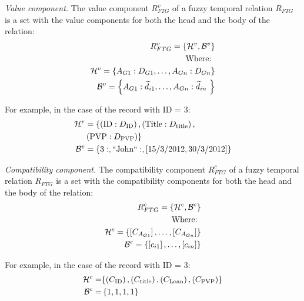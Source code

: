 \begin{definition}
\label{def:value-component}
\emph{Value component.}
The value component $R^{v}_{FTG}$ of a fuzzy temporal relation $R_{FTG}$ is a set with the value components for both the head and the body of the relation:
\begin{align}
\label{eq:value-component}
R^{v}_{FTG} = \left \lbrace \mathcal{H}^{v},\mathcal{B}^{v} \right \rbrace \\
\nonumber
\text{Where: } \\
\nonumber
\mathcal{H}^{v} = \left \lbrace A_{G1}:D_{G1}, \ldots,  A_{Gn}:D_{Gn} \right \rbrace \\
\nonumber
\mathcal{B}^ {v} = \left \lbrace A_{G1}:\widetilde{d}_{i1}, \ldots,  A_{Gn}:\widetilde{d}_{in}\ \right \rbrace 
\end{align}
\end{definition}

For example, in the case of the record with ID = 3:
\begin{align}
\nonumber
\mathcal{H}^{v} &=  \lbrace \left(\text{ID}:D_{\text{ID}}\right), \left(\text{Title}:D_{\text{title}}\right),\\
\nonumber
& \left(\text{PVP}:D_{\text{PVP}}\right) \rbrace \\
\nonumber
\mathcal{B}^ {v} &= \left \lbrace 3:, \text{``John``}: ,  \left[15/3/2012, 30/3/2012\right] \right \rbrace 
\end{align}


\begin{definition}
\label{def:compatibility-component}
\emph{Compatibility component.}
The compatibility component $R^{c}_{FTG}$ of a fuzzy temporal relation $R_{FTG}$ is a set with the compatibility components for both the head and the body of the relation:
\begin{align}
\label{eq:compatibility-component}
R^{c}_{FTG} = \left \lbrace \mathcal{H}^{c},\mathcal{B}^{c} \right \rbrace \\
\nonumber
\text{Where: } \\
\nonumber
\mathcal{H}^{c} = \left \lbrace \left[C_{A_{G1}} \right], \ldots,  \left[C_{A_{Gn}} \right] \right \rbrace \\
\nonumber
\mathcal{B}^ {c} = \left \lbrace \left[ c_{i1} \right], \ldots, \left[ c_{in} \right] \right \rbrace 
\end{align}
\end{definition}

For example, in the case of the record with ID = 3:
\begin{align}
\nonumber
\mathcal{H}^{c} = & \lbrace \left(C_\text{ID}\right), \left(C_{\text{title}}\right), \left(C_{\text{Loan}}\right), \left(C_{\text{PVP}}\right) \rbrace \\
\nonumber
\mathcal{B}^ {c} = &\left \lbrace 1, 1, 1, 1 \right \rbrace 
\end{align}


